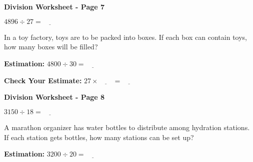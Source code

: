 \documentclass[letterpaper,12pt]{article} %
\begin{document}
\newpage



\Huge \textbf{Division Worksheet - Page 7}

\huge $ 4896 \div 27 = \underline{\hspace{2em}} $

\vspace{1em} %
\Large In a toy factory, \underline{\hspace{2em}} toys are to be packed into boxes. If each box can contain \underline{\hspace{2em}} toys, how many boxes will be filled?

\vspace{1em} %
\Large \textbf{Estimation:}
\huge $ 4800 \div 30 = \underline{\hspace{2em}} $

\vspace{1em} %
\Large \textbf{Check Your Estimate:}
\huge $ 27 \times \underline{\hspace{2em}} = \underline{\hspace{2em}} $

\vfill
{}

\newpage



\Huge \textbf{Division Worksheet - Page 8}

\huge $ 3150 \div 18 = \underline{\hspace{2em}} $

\vspace{1em} %
\Large A marathon organizer has \underline{\hspace{2em}} water bottles to distribute among hydration stations. If each station gets \underline{\hspace{2em}} bottles, how many stations can be set up?

\vspace{1em} %
\Large \textbf{Estimation:}
\huge $ 3200 \div 20 = \underline{\hspace{2em}} $
\end{document}
